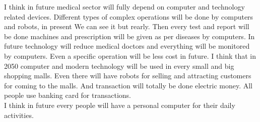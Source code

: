 I think in future medical sector will fully depend on computer and technology related devices. Different types of complex operations will be done by computers and robots, in present We can see it but rearly. Then every test and report will be done machines and prescription will be given as per diseases by computers. In future technology will reduce medical doctors and everything will be monitored by computers. Even a specific operation will be less cost in future.
I think that in 2050 computer and modern technology will be used in every small and big shopping malls. Even there will have robots for selling and attracting customers for coming to the malls. And transaction will totally be done electric money. All people use banking card for transactions. \\
I think in future every people will have a personal computer for their daily activities.
